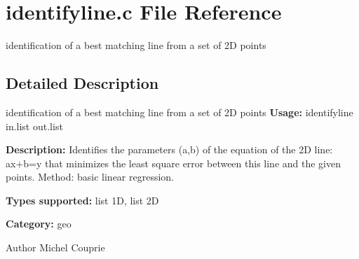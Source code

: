 \section{identifyline.c File Reference}
\label{identifyline_8c}


identification of a best matching line from a set of 2D points  




\subsection{Detailed Description}
identification of a best matching line from a set of 2D points {\bfseries Usage:} identifyline in.list out.list

{\bfseries Description:} Identifies the parameters (a,b) of the equation of the 2D line: ax+b=y that minimizes the least square error between this line and the given points. Method: basic linear regression.

{\bfseries Types supported:} list 1D, list 2D

{\bfseries Category:} geo

\begin{DoxyAuthor}{Author}
Michel Couprie 
\end{DoxyAuthor}
